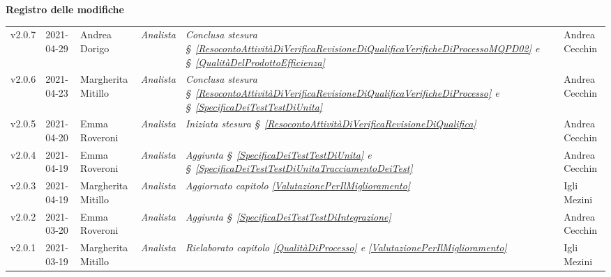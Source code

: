 \quad
\begin{center}
	\LARGE\textbf{Registro delle modifiche}
\end{center}

\def\tabularxcolumn#1{m{#1}}
{
\begin{center}
	\renewcommand{\arraystretch}{1.4}
	\begin{longtable}[c]{|p{2cm-1\tabcolsep}|p{2cm}|p{}|p{}|p{}|p{4cm-2\tabcolsep}|}
		\hline
		\rowcolor{airforceblue}
		\makecell[tc]{\textbf{Versione}} & \makecell[tc]{\textbf{Data}} & \makecell[tc]{\textbf{Autore}} & \makecell[tc]{\textbf{Ruolo}} & \makecell[tc]{\textbf{Modifica}} & \makecell[tc]{\textbf{Verificatore}}\\
		\hline
		\centering v2.0.7 & 2021-04-29 & Andrea Dorigo & \centering \textit{Analista}  &  \textit{Conclusa stesura  \S~\ref{ResocontoAttivitàDiVerificaRevisioneDiQualificaVerificheDiProcessoMQPD02} e \S~\ref{QualitàDelProdottoEfficienza}} & Andrea Cecchin \\
		\hline
		\centering v2.0.6 & 2021-04-23 & Margherita Mitillo & \centering \textit{Analista}  &  \textit{Conclusa stesura  \S~\ref{ResocontoAttivitàDiVerificaRevisioneDiQualificaVerificheDiProcesso} e \S~\ref{SpecificaDeiTestTestDiUnita}} & Andrea Cecchin \\
		\hline
		\centering v2.0.5 & 2021-04-20 & Emma Roveroni & \centering \textit{Analista}  &  \textit{Iniziata stesura  \S~\ref{ResocontoAttivitàDiVerificaRevisioneDiQualifica}} & Andrea Cecchin \\
		\hline
		\centering v2.0.4 & 2021-04-19 & Emma Roveroni & \centering \textit{Analista}  &  \textit{Aggiunta \S~\ref{SpecificaDeiTestTestDiUnita} e \S~\ref{SpecificaDeiTestTestDiUnitaTracciamentoDeiTest}} & Andrea Cecchin \\
		\hline
		\centering v2.0.3 & 2021-04-19 & Margherita Mitillo  & \centering \textit{Analista}   &  \textit{Aggiornato capitolo \ref{ValutazionePerIlMiglioramento}} & Igli Mezini \\
		\hline
		\centering v2.0.2 & 2021-03-20 & Emma Roveroni & \centering \textit{Analista}  &  \textit{Aggiunta \S~\ref{SpecificaDeiTestTestDiIntegrazione}} & Andrea Cecchin \\
		\hline
		\centering v2.0.1 & 2021-03-19 & Margherita Mitillo  & \centering \textit{Analista}   &  \textit{Rielaborato capitolo \ref{QualitàDiProcesso} e \ref{ValutazionePerIlMiglioramento}} & Igli Mezini \\

\end{longtable}
\end{center}}
